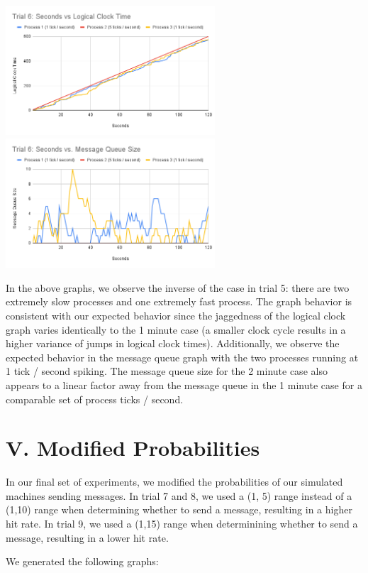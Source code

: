 \documentclass[
	a4paper, %
	10pt, %
	unnumberedsections, %
	twoside, %
]{LTJournalArticle}
\begin{document}
\includegraphics[width=7.8cm]{assets/t6_clock.png}
\includegraphics[width=7.8cm]{assets/t6_size.png}

In the above graphs, we observe the inverse of the case in trial 5: there are two extremely slow processes and one extremely fast process. The graph behavior is consistent with our expected behavior since the jaggedness of the logical clock graph varies identically to the 1 minute case (a smaller clock cycle results in a higher variance of jumps in logical clock times). Additionally, we observe the expected behavior in the message queue graph with the two processes running at 1 tick / second spiking. The message queue size for the 2 minute case also appears to a linear factor away from the message queue in the 1 minute case for a comparable set of process ticks / second.

\section{V. Modified Probabilities}

In our final set of experiments, we modified the probabilities of our simulated machines sending messages. In trial 7 and 8, we used a (1, 5) range instead of a (1,10) range when determining whether to send a message, resulting in a higher hit rate. In trial 9, we used a (1,15) range when determinining whether to send a message, resulting in a lower hit rate. 

We generated the following graphs: 
\end{document}

